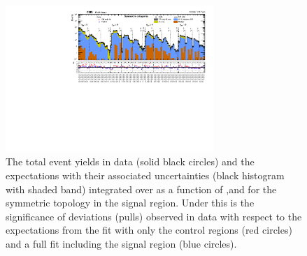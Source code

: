 \begin{figure}[!h]
  \begin{center}
    \includegraphics[angle=90,width=0.7\textwidth]{figs/analysis/results/summaryPlot_Symmetric_prefit_overlay_fit_b}
    \caption{The total event yields in data (solid black circles)
      and the \SM expectations with their associated uncertainties (black
      histogram with shaded band) integrated over \MHT as a function of
      \nj,\nb and \HT for the symmetric topology in the
      signal region. Under this is the significance of deviations
      (pulls) observed in data with respect to the \SM expectations
      from the fit with only the control regions (red circles) and a
      full fit including the signal region (blue circles).}
    \label{fig:sym}
  \end{center}
\end{figure}

